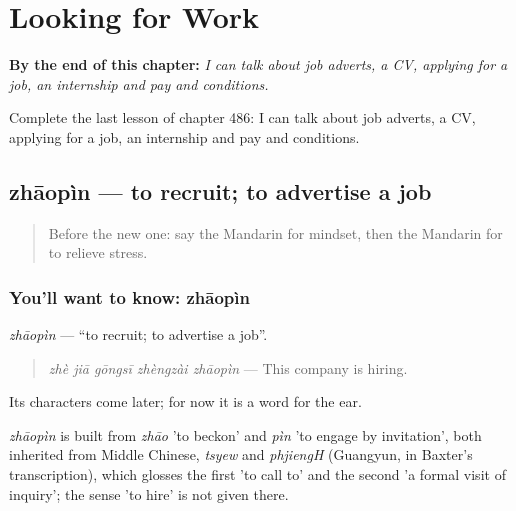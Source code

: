 
\chapter{Looking for Work}
\label{ch:zh-looking-for-work}

\begin{chapteropening}
\textbf{By the end of this chapter:} \emph{I can talk about job adverts, a CV, applying for a job, an internship and pay and conditions.}

Complete the last lesson of chapter 486: I can talk about job adverts, a CV, applying for a job, an internship and pay and conditions.
\end{chapteropening}

\section[zhāopìn]{zhāopìn — to recruit; to advertise a job}

\label{lesson:ZH-C486-zhaopin}



\begin{quote}
Before the new one: say the Mandarin for mindset, then the Mandarin for to relieve stress.
\end{quote}

\subsection*{You'll want to know: zhāopìn}
\emph{zhāopìn} — \textquotedblleft{}to recruit; to advertise a job\textquotedblright{}.

\begin{quote}
\emph{zhè jiā gōngsī zhèngzài zhāopìn} — This company is hiring.
\end{quote}

Its characters come later; for now it is a word for the ear.

\begin{cousinweb}
\emph{zhāopìn} is built from \emph{zhāo} 'to beckon' and \emph{pìn} 'to engage by invitation', both inherited from Middle Chinese, \emph{tsyew} and \emph{phjiengH} (Guangyun, in Baxter's transcription), which glosses the first 'to call to' and the second 'a formal visit of inquiry'; the sense 'to hire' is not given there.
\end{cousinweb}

